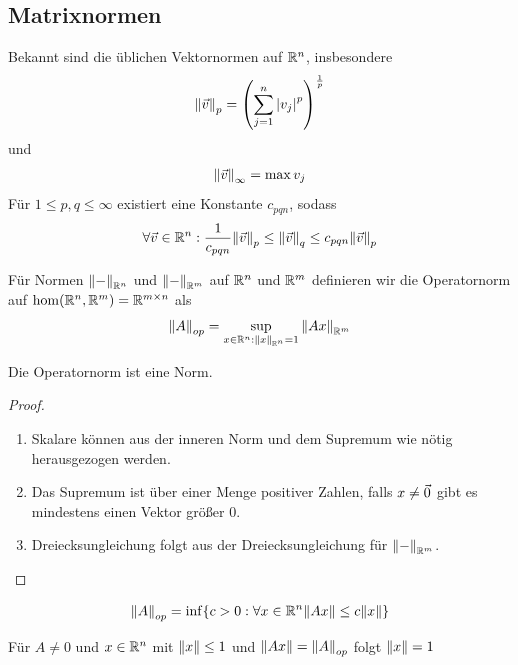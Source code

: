 \documentclass{report}
\begin{document}
\subsection{Matrixnormen}
Bekannt sind die üblichen Vektornormen auf $\mathbb{R}^n$, insbesondere 
\begin{align*}
	\norm{\vec{v}}_p = \left(\sum_{j = 1}^n \abs{v_j}^p\right)^{\frac{1}{p}}
\end{align*}
und
\begin{align*}
	\norm{\vec{v}}_\infty = \max v_j
\end{align*} 
Für $1 \leq p,q \leq \infty$ existiert eine Konstante $c_{pqn}$, sodass
\begin{align*}
	\forall \vec{v} \in \mathbb{R}^n : \frac{1}{c_{pqn}}\norm{\vec{v}}_p \leq \norm{\vec{v}}_q \leq c_{pqn}\norm{\vec{v}}_p 
\end{align*}
\begin{definition}
	Für Normen $\norm{-}_{\mathbb{R}^n}$ und $\norm{-}_{\mathbb{R}^m}$ auf $\mathbb{R}^n$ und $\mathbb{R}^m$ definieren wir die Operatornorm auf $\hom(\mathbb{R}^n, \mathbb{R}^m) = \mathbb{R}^{m \times n}$ als
	\begin{align*}
		\norm{A}_{op} = \sup_{x \in \mathbb{R}^n : \norm{x}_{\mathbb{R}^n} = 1} \norm{Ax}_{\mathbb{R}^m}
	\end{align*}
\end{definition}
\begin{lemma}
	Die Operatornorm ist eine Norm.
\end{lemma}
\begin{proof}
	\begin{enumerate}
		\item Skalare können aus der inneren Norm und dem Supremum wie nötig herausgezogen werden.
		\item Das Supremum ist über einer Menge positiver Zahlen, falls $x \neq \vec{0}$ gibt es mindestens einen Vektor größer $0$.
		\item Dreiecksungleichung folgt aus der Dreiecksungleichung für $\norm{-}_{\mathbb{R}^m}$.
	\end{enumerate}
\end{proof}
\begin{lemma}
	\begin{align*}
		\norm{A}_{op} = \inf \{c > 0 : \forall x \in \bR^n \norm{Ax} \leq c\norm{x}\}
	\end{align*}
\end{lemma}
\begin{lemma}
	Für $A \neq 0$ und $x \in \mathbb{R}^n$ mit $\norm{x} \leq 1$ und $\norm{Ax} = \norm{A}_{op}$ folgt $\norm{x} = 1$
\end{lemma}
\end{document}
